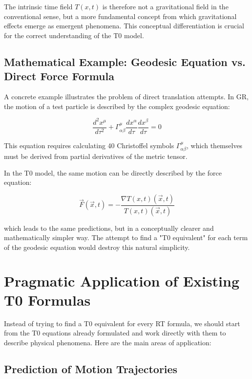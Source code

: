 \documentclass[12pt,a4paper]{article}
\newcommand{\Tfieldt}{T(x,t)}
\newcommand{\vecx}{\vec{x}}
\begin{document}
	The intrinsic time field $\Tfieldt$ is therefore not a gravitational field in the conventional sense, but a more fundamental concept from which gravitational effects emerge as emergent phenomena. This conceptual differentiation is crucial for the correct understanding of the T0 model.
	
	\subsection{Mathematical Example: Geodesic Equation vs. Direct Force Formula}
	\label{subsec:math_example}
	
	A concrete example illustrates the problem of direct translation attempts. In GR, the motion of a test particle is described by the complex geodesic equation:
	
	\begin{equation}
		\frac{d^2 x^\mu}{d\tau^2} + \Gamma^\mu_{\alpha\beta} \frac{dx^\alpha}{d\tau} \frac{dx^\beta}{d\tau} = 0
	\end{equation}
	
	This equation requires calculating 40 Christoffel symbols $\Gamma^\mu_{\alpha\beta}$, which themselves must be derived from partial derivatives of the metric tensor.
	
	In the T0 model, the same motion can be directly described by the force equation:
	
	\begin{equation}
		\vec{F}(\vecx,t) = -\frac{\nabla\Tfieldt(\vecx,t)}{\Tfieldt(\vecx,t)}
	\end{equation}
	
	which leads to the same predictions, but in a conceptually clearer and mathematically simpler way. The attempt to find a "T0 equivalent" for each term of the geodesic equation would destroy this natural simplicity.
	
	\section{Pragmatic Application of Existing T0 Formulas}
	\label{sec:pragmatic_approach}
	
	Instead of trying to find a T0 equivalent for every RT formula, we should start from the T0 equations already formulated and work directly with them to describe physical phenomena. Here are the main areas of application:
	
	\subsection{Prediction of Motion Trajectories}
	\label{subsec:trajectories}
	
\end{document}
